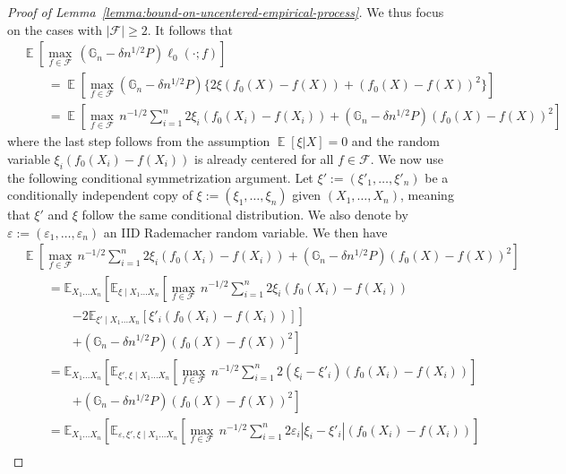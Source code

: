 \documentclass[12pt]{article}
\DeclareMathOperator*{\E}{\mathbb{E}}
\begin{document}
\begin{appendices}
\begin{proof}[Proof of Lemma~\ref{lemma:bound-on-uncentered-empirical-process}]
We thus focus on the cases with $|\mathcal{F}|\ge 2$. It follows that 
	\begin{align}
		&\E\left[\max_{f \in \mathcal{F}}\,\left(\mathbb{G}_n -\delta n^{1/2} P\right)\ell_0(\cdot; f)\right]\nonumber\\
		&\qquad = \E\left[\max_{f \in \mathcal{F}}\left(\mathbb{G}_n -\delta n^{1/2} P\right)\{2\xi(f_0(X)-f(X))+(f_0(X)-f(X))^2\}\right]\nonumber\\
		&\qquad = \E\left[\max_{f \in \mathcal{F}}\, n^{-1/2}\sum_{i=1}^n 2\xi_i(f_0(X_i)-f(X_i))+\left(\mathbb{G}_n -\delta n^{1/2} P\right)(f_0(X)-f(X))^2\right]\nonumber
	\end{align}
 where the last step follows from the assumption $\E[\xi| X]=0$ and the random variable $\xi_i(f_0(X_i)-f(X_i))$ is already centered for all $f \in \mathcal{F}$. We now use the following conditional symmetrization argument. Let $\xi' := (\xi'_1, \dots, \xi'_n)$ be a conditionally independent copy of $\xi :=(\xi_1, \dots, \xi_n)$ given $(X_1, \dots, X_n)$, meaning that $\xi'$ and $\xi$ follow the same conditional distribution. We also denote by $\varepsilon := (\varepsilon_1,\ldots, \varepsilon_n)$ an IID Rademacher random variable. We then have
\begin{align}
    &\E\left[\max_{f\in\mathcal{F}}\,n^{-1/2}\sum_{i=1}^n 2\xi_i (f_0(X_i)- f(X_i))+\left(\mathbb{G}_n -\delta n^{1/2} P\right)(f_0(X)-f(X))^2\right] \nonumber\\
    &\qquad = \mathbb{E}_{X_1 \dots X_n}\left[\mathbb{E}_{\xi \mid X_1 \dots X_n}\left[\max_{f\in\mathcal{F}}\,n^{-1/2}\sum_{i=1}^n 2\xi_i (f_0(X_i)-  f(X_i))\right.\right.\\
    &\qquad\qquad\left.\left.-2\mathbb{E}_{\xi' \mid X_1 \dots X_n}[\xi'_i (f_0(X_i)- f(X_i))]\right]\right.\nonumber\\
    &\qquad\qquad\left. + \left(\mathbb{G}_n -\delta n^{1/2} P\right)(f_0(X)-f(X))^2\right]\nonumber\\
     &\qquad = \mathbb{E}_{X_1 \dots X_n}\left[\mathbb{E}_{\xi', \xi \mid X_1 \dots X_n}\left[\max_{f\in\mathcal{F}}\,n^{-1/2}\sum_{i=1}^n 2(\xi_i-\xi'_i) (f_0(X_i)-  f(X_i)) \right]\right.\nonumber\\
    &\qquad\qquad\left. + \left(\mathbb{G}_n -\delta n^{1/2} P\right)(f_0(X)-f(X))^2\right]\nonumber\\
    &\qquad = \mathbb{E}_{X_1 \dots X_n}\left[\mathbb{E}_{\varepsilon, \xi', \xi \mid X_1 \dots X_n}\left[\max_{f\in\mathcal{F}}\,n^{-1/2}\sum_{i=1}^n 2\varepsilon_i|\xi_i-\xi'_i| (f_0(X_i)-  f(X_i))\right]\right.\nonumber\\

\end{align}
\end{proof}
\end{appendices}
\end{document}
